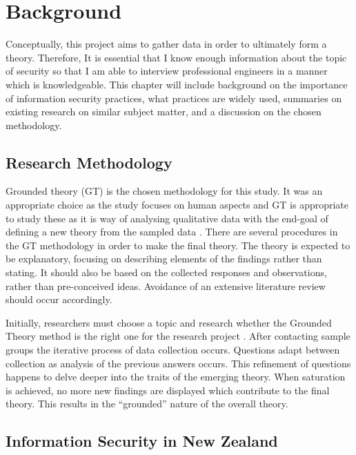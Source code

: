 \chapter{Background}\label{C:Background}

\par Conceptually, this project aims to gather data in order to ultimately form a theory. Therefore, It is essential that I know enough information about the topic of security so that I am able to interview professional engineers in a manner which is knowledgeable. This chapter will include background on the importance of information security practices, what practices are widely used, summaries on existing research on similar subject matter, and a discussion on the chosen methodology.  

\section{Research Methodology}

Grounded theory (GT) is the chosen methodology for this study. It was an appropriate choice as the study focuses on human aspects and GT is appropriate to study these as it is way of analysing qualitative data with the end-goal of defining a new theory from the sampled data \cite{geeks}. There are several procedures in the GT  methodology in order to make the final theory.  The theory is expected to be explanatory, focusing on describing elements of the findings rather than stating. It should also be based on the collected responses and observations, rather than pre-conceived ideas. Avoidance of an extensive literature review should occur accordingly.
\newline
\par Initially, researchers must choose a topic and research whether the Grounded Theory method is the right one for the research project \cite{geeks}. After contacting sample groups the iterative process of data collection occurs. Questions adapt between collection as analysis of the previous answers occurs. This refinement of questions happens to delve deeper into the traits of the emerging theory. When saturation is achieved, no more new findings are displayed which contribute to the final theory. This results in the “grounded” nature of the overall theory.

\section{Information Security in New Zealand}

